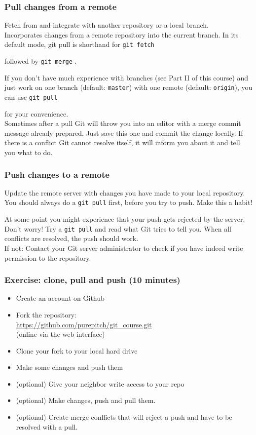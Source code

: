 \documentclass{gittalk}
\newenvironment{exerciseframe}
{
\setbeamercolor{background canvas}{bg=orange!20}
\begin{frame}
}
{
\end{frame}
}
\newcommand{\hlcommand}[1]{ %
\colorbox{base3}{\small \texttt{#1}}
}
\begin{document}
\begin{frame}[fragile]
\frametitle{Pull changes from a remote}
\begin{tcolorbox}[title=git pull]
Fetch from and integrate with another repository or a local 
branch.\\[0.5em]
Incorporates changes from a remote repository into the current branch. 
In its default mode, git pull is shorthand for \hlcommand{git fetch} 
followed by \hlcommand{git merge}.
\end{tcolorbox}
\vspace*{0.5em}
If you don't have much experience with branches (see Part II of this 
course) and just work on one branch (default: \texttt{master}) with 
one remote (default: \texttt{origin}), you can use \hlcommand{git pull}
for your convenience.\\[0.5em]
Sometimes after a pull Git will throw you into an editor with a merge 
commit message already prepared. Just save this one and commit the 
change locally. If there is a conflict Git cannot resolve itself, it 
will inform you about it and tell you what to do.
\end{frame}

\begin{frame}[fragile]
\frametitle{Push changes to a remote}
\begin{tcolorbox}[title=git push]
Update the remote server with changes you have made to your local 
repository.\\[0.5em]
You should always do a  \hlcommand{git pull} first, before you try to 
push. Make this a habit!
\end{tcolorbox}

At some point you might experience that your push gets rejected by the 
server. Don't worry! Try a \hlcommand{git pull} and read what Git 
tries to tell you. When all conflicts are resolved, the push should 
work.\\[0.5em]
If not: Contact your Git server administrator to check if you have 
indeed write permission to the repository. 

\end{frame}

\begin{exerciseframe}
\frametitle{Exercise: clone, pull and push \hfill (10 minutes)}
\begin{itemize}
  \item Create an account on Github
  \item Fork the repository: \\
  \url{https://github.com/purepitch/git_course.git} \\
  (online via the web interface)
  \item Clone your fork to your local hard drive
  \item Make some changes and push them
  \item (optional) Give your neighbor write access to your repo
  \item (optional) Make changes, push and pull them.
  \item (optional) Create merge conflicts that will reject a push and 
  have to be resolved with a pull.
\end{itemize}
\end{exerciseframe}
\end{document}
